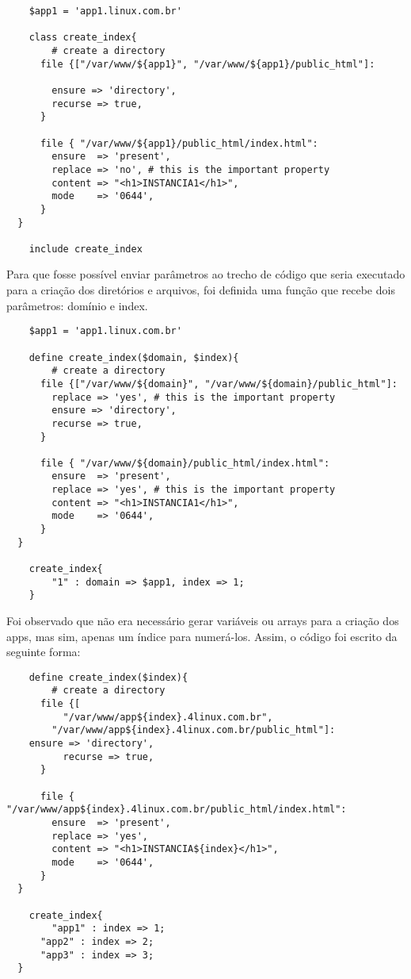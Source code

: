 \documentclass[12pt]{article}
\begin{document}
\begin{verbatim}
    $app1 = 'app1.linux.com.br'

    class create_index{
        # create a directory      
      file {["/var/www/${app1}", "/var/www/${app1}/public_html"]:

        ensure => 'directory',
        recurse => true,
      }

      file { "/var/www/${app1}/public_html/index.html":
        ensure  => 'present',
        replace => 'no', # this is the important property
        content => "<h1>INSTANCIA1</h1>",
        mode    => '0644',
      }
  }

    include create_index
\end{verbatim}

Para que fosse possível enviar parâmetros ao trecho de código que seria executado para a criação dos diretórios e arquivos,
foi definida uma função que recebe dois parâmetros: domínio e index.

\begin{verbatim}
    $app1 = 'app1.linux.com.br'

    define create_index($domain, $index){
        # create a directory      
      file {["/var/www/${domain}", "/var/www/${domain}/public_html"]:
        replace => 'yes', # this is the important property
        ensure => 'directory',
        recurse => true,
      }

      file { "/var/www/${domain}/public_html/index.html":
        ensure  => 'present',
        replace => 'yes', # this is the important property
        content => "<h1>INSTANCIA1</h1>",
        mode    => '0644',
      }
  }

    create_index{
        "1" : domain => $app1, index => 1;
    }
\end{verbatim}

Foi observado que não era necessário gerar variáveis ou arrays para a criação dos apps, mas sim, apenas um índice para numerá-los.
Assim, o código foi escrito da seguinte forma:

\begin{verbatim}
    define create_index($index){
        # create a directory      
      file {[
          "/var/www/app${index}.4linux.com.br",
        "/var/www/app${index}.4linux.com.br/public_html"]:
    ensure => 'directory',
          recurse => true,
      }

      file { "/var/www/app${index}.4linux.com.br/public_html/index.html":
        ensure  => 'present',
        replace => 'yes',
        content => "<h1>INSTANCIA${index}</h1>",
        mode    => '0644',
      }
  }

    create_index{
        "app1" : index => 1;
      "app2" : index => 2;
      "app3" : index => 3;
  }
\end{verbatim}
\end{document}
